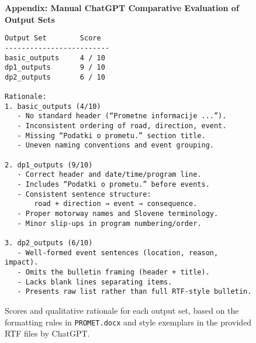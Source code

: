 \begin{figure*}[t]
    \centering
    \caption*{\textbf{Appendix: Manual ChatGPT Comparative Evaluation of Output Sets}}

    \begin{verbatim}
Output Set        Score  
-------------------------
basic_outputs     4 / 10  
dp1_outputs       9 / 10  
dp2_outputs       6 / 10  

Rationale:
1. basic_outputs (4/10)
   - No standard header (“Prometne informacije ...”).
   - Inconsistent ordering of road, direction, event.
   - Missing “Podatki o prometu.” section title.
   - Uneven naming conventions and event grouping.

2. dp1_outputs (9/10)
   - Correct header and date/time/program line.
   - Includes “Podatki o prometu.” before events.
   - Consistent sentence structure:
       road + direction → event → consequence.
   - Proper motorway names and Slovene terminology.
   - Minor slip-ups in program numbering/order.

3. dp2_outputs (6/10)
   - Well-formed event sentences (location, reason, impact).
   - Omits the bulletin framing (header + title).
   - Lacks blank lines separating items.
   - Presents raw list rather than full RTF-style bulletin.
    \end{verbatim}

    \caption{Scores and qualitative rationale for each output set,  
             based on the formatting rules in \texttt{PROMET.docx}  
             and style exemplars in the provided RTF files by ChatGPT.}
    \label{fig:appendix_comparison}
\end{figure*}